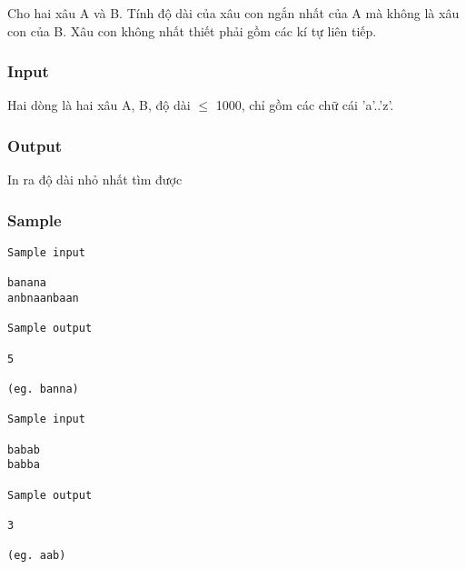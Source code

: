 



   Cho hai xâu A và B. Tính độ dài của xâu con ngắn nhất của A mà không là  xâu con của B. Xâu con không nhất thiết phải gồm các kí tự liên tiếp.  



\subsubsection{   Input  }



   Hai dòng là hai xâu A, B, độ dài  $\le$ 1000, chỉ gồm các chữ cái 'a'..'z'.  



\subsubsection{   Output  }



   In ra độ dài nhỏ nhất tìm được  



\subsubsection{   Sample  }
\begin{verbatim}
Sample input
 
banana 
anbnaanbaan 
 
Sample output
 
5 
 
(eg. banna) 

Sample input
 
babab 
babba 
 
Sample output
 
3 
 
(eg. aab) 
\end{verbatim}
